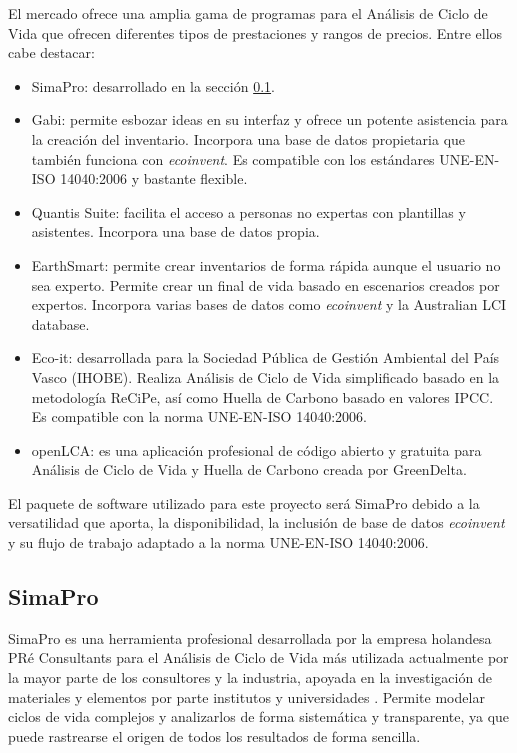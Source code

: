 El mercado ofrece una amplia gama de programas para el Análisis de Ciclo de Vida que ofrecen diferentes tipos de prestaciones y rangos de precios. Entre ellos cabe destacar:
\begin{itemize}
  \item SimaPro: desarrollado en la sección \ref{sec:simapro}.
  \item Gabi: permite esbozar ideas en su interfaz y ofrece un potente asistencia para la creación del inventario. Incorpora una base de datos propietaria que también funciona con \textit{ecoinvent}. Es compatible con los estándares UNE-EN-ISO 14040:2006 y bastante flexible.
  \item Quantis Suite: facilita el acceso a personas no expertas con plantillas y asistentes. Incorpora una base de datos propia.
  \item EarthSmart: permite crear inventarios de forma rápida aunque el usuario no sea experto. Permite crear un final de vida basado en escenarios creados por expertos. Incorpora varias bases de datos como \textit{ecoinvent} y la Australian LCI database.
  \item Eco-it: desarrollada para la Sociedad Pública de Gestión Ambiental del País Vasco (IHOBE). Realiza Análisis de Ciclo de Vida simplificado basado en la metodología ReCiPe, así como Huella de Carbono basado en valores IPCC. Es compatible con la norma UNE-EN-ISO 14040:2006.
  \item openLCA: es una aplicación profesional de código abierto y gratuita para Análisis de Ciclo de Vida y Huella de Carbono creada por GreenDelta.
\end{itemize}

El paquete de software utilizado para este proyecto será SimaPro debido a la versatilidad que aporta, la disponibilidad, la inclusión de base de datos \textit{ecoinvent} y su flujo de trabajo adaptado a la norma UNE-EN-ISO 14040:2006.

\subsection{SimaPro}\label{sec:simapro}
SimaPro es una herramienta profesional desarrollada por la empresa holandesa PRé Consultants para el Análisis de Ciclo de Vida más utilizada actualmente por la mayor parte de los consultores y la industria, apoyada en la investigación de materiales y elementos por parte institutos y universidades \cite{mgoedkoop}. Permite modelar ciclos de vida complejos y analizarlos de forma sistemática y transparente, ya que puede rastrearse el origen de todos los resultados de forma sencilla.

